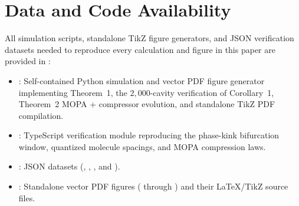 \documentclass[11pt,letterpaper]{article}
\begin{document}
\section*{Data and Code Availability}

{\sloppy
All simulation scripts, standalone TikZ figure generators, and JSON verification datasets needed to reproduce every calculation and figure in this paper are provided in :
\begin{itemize}
    \item {}: Self-contained Python simulation and vector PDF figure generator implementing Theorem~1, the $2{,}000$-cavity verification of Corollary~1, Theorem~2 MOPA + compressor evolution, and standalone TikZ PDF compilation.
    \item {}: TypeScript verification module reproducing the phase-kink bifurcation window, quantized molecule spacings, and MOPA compression laws.
    \item {}: JSON datasets (, , , and ).
    \item {}: Standalone vector PDF figures ( through ) and their LaTeX/TikZ source files.
\end{itemize}
\par}
\end{document}
